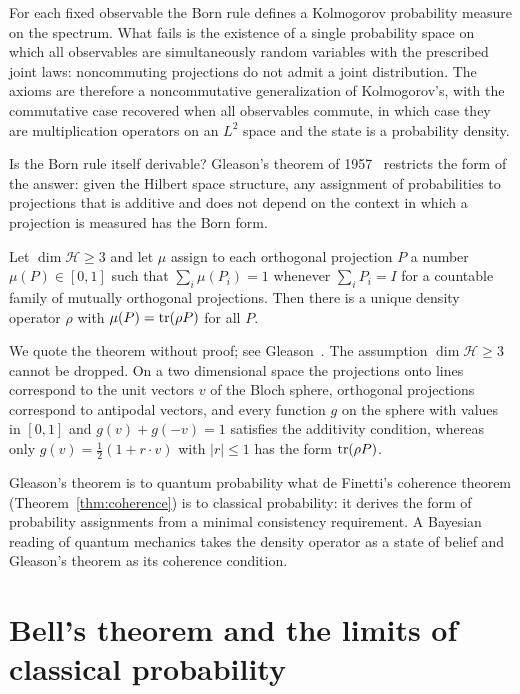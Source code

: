 For each fixed observable the Born rule defines a Kolmogorov probability measure on the spectrum. What fails is the existence of a single probability space on which all observables are simultaneously random variables with the prescribed joint laws: noncommuting projections do not admit a joint distribution. The axioms are therefore a noncommutative generalization of Kolmogorov's, with the commutative case recovered when all observables commute, in which case they are multiplication operators on an $L^2$ space and the state is a probability density.

Is the Born rule itself derivable? Gleason's theorem of 1957~\cite{gleason1957} restricts the form of the answer: given the Hilbert space structure, any assignment of probabilities to projections that is additive and does not depend on the context in which a projection is measured has the Born form.

\begin{theorem}[Gleason]
Let $\dim\mathcal{H}\geq3$ and let $\mu$ assign to each orthogonal projection $P$ a number $\mu(P)\in[0,1]$ such that $\sum_i\mu(P_i) = 1$ whenever $\sum_iP_i = I$ for a countable family of mutually orthogonal projections. Then there is a unique density operator $\rho$ with $\mu(P) = \mathrm{tr}(\rho P)$ for all $P$.
\end{theorem}

We quote the theorem without proof; see Gleason~\cite[Theorem~4.1]{gleason1957}. The assumption $\dim\mathcal{H}\geq3$ cannot be dropped. On a two dimensional space the projections onto lines correspond to the unit vectors $v$ of the Bloch sphere, orthogonal projections correspond to antipodal vectors, and every function $g$ on the sphere with values in $[0,1]$ and $g(v)+g(-v) = 1$ satisfies the additivity condition, whereas only $g(v) = \frac12(1+r\cdot v)$ with $|r|\leq1$ has the form $\mathrm{tr}(\rho P)$.

Gleason's theorem is to quantum probability what de Finetti's coherence theorem (Theorem~\ref{thm:coherence}) is to classical probability: it derives the form of probability assignments from a minimal consistency requirement. A Bayesian reading of quantum mechanics takes the density operator as a state of belief and Gleason's theorem as its coherence condition.

\section{Bell's theorem and the limits of classical probability}

